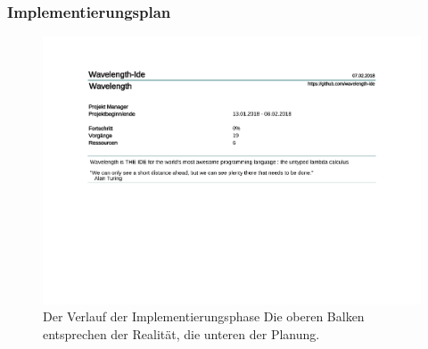 \documentclass[10pt]{beamer}
\begin{document}
\begin{frame}
\frametitle{Implementierungsplan}
\begin{figure}[h]
\includegraphics[trim={0, 7cm, 0, 0}, clip, scale=0.4, page=4]{Implementierungsplan/Implementierungsplan.pdf}
\caption[caption]{Der Verlauf der Implementierungsphase 
\newline
Die oberen Balken entsprechen der Realität, die unteren der Planung.}
\end{figure}
\end{frame}

\end{document}
